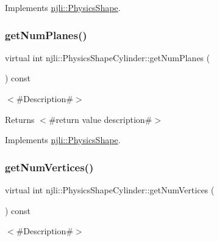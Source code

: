 Implements \mbox{\hyperlink{classnjli_1_1_physics_shape_a24df999ba2b7ac0d9abda09c4f17c2fe}{njli\+::\+Physics\+Shape}}.

\mbox{\label{classnjli_1_1_physics_shape_cylinder_ac0494575204d508cc5f91ebe68d3addf}} 
\subsubsection{\texorpdfstring{get\+Num\+Planes()}{getNumPlanes()}}
{\footnotesize\ttfamily virtual int njli\+::\+Physics\+Shape\+Cylinder\+::get\+Num\+Planes (\begin{DoxyParamCaption}{ }\end{DoxyParamCaption}) const\hspace{0.3cm}{\ttfamily [virtual]}}

$<$\#\+Description\#$>$

\begin{DoxyReturn}{Returns}
$<$\#return value description\#$>$ 
\end{DoxyReturn}


Implements \mbox{\hyperlink{classnjli_1_1_physics_shape_a11cb80220393bfce177b8bdc34f7f359}{njli\+::\+Physics\+Shape}}.

\mbox{\label{classnjli_1_1_physics_shape_cylinder_af865d6862f4dd8849f4b9290a3907337}} 
\subsubsection{\texorpdfstring{get\+Num\+Vertices()}{getNumVertices()}}
{\footnotesize\ttfamily virtual int njli\+::\+Physics\+Shape\+Cylinder\+::get\+Num\+Vertices (\begin{DoxyParamCaption}{ }\end{DoxyParamCaption}) const\hspace{0.3cm}{\ttfamily [virtual]}}

$<$\#\+Description\#$>$


